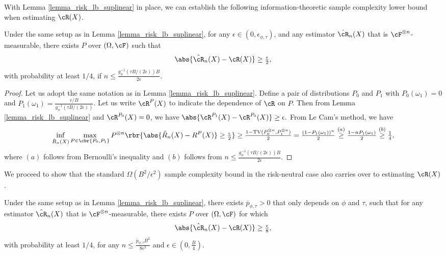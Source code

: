 \documentclass[9pt]{article} %
\numberwithin{equation}{section}
\renewcommand{\frac}[2]{\tfrac{#1}{#2}}
\begin{document}
With Lemma \ref{lemma_risk_lb_suplinear} in place, we can establish the following information-theoretic sample complexity lower bound when estimating $\cR(X)$. 




\begin{theorem}\label{thrm_sample_lb_growth_suplinear}
Under the same setup as in Lemma \ref{lemma_risk_lb_suplinear}, for any $\epsilon \in (0,  \epsilon_{\phi, \tau})$,  and any estimator $\hat{\cR}_n(X)$ that is $\cF^{\otimes n}$-measurable,
there exists $P$ over $(\Omega, \cF)$ such that 
\begin{align*}
\abs{\hat{\cR}_n (X) - \cR(X) } \geq \frac{\epsilon}{2},
\end{align*}
with probability at least $1/4$, 
if $n \leq \frac{ g_{\phi}^{-1} (\tau B / (2\epsilon)) B }{  2\epsilon }$.
\end{theorem}

\begin{proof}
Let us adopt the same notation as in Lemma \ref{lemma_risk_lb_suplinear}.
Define a pair of distributions $P_0$ and $P_1$ with
$P_0(\omega_1) = 0$ and $P_1(\omega_1) = \frac{\epsilon / B}{g_\phi^{-1}( \tau B / (2\epsilon))}$.
Let us write $\cR^P(X)$ to indicate the dependence of $\cR$ on $P$.
Then from Lemma \ref{lemma_risk_lb_suplinear} and $\cR^{P_0}(X) = 0$, we have 
$
\abs{\cR^{P_1}(X) - \cR^{P_0}(X)} \geq  \epsilon.
$
From Le Cam's method, we have 
\begin{align*}
\inf_{\hat{R}_n (X) } \max_{P \in \cbr{P_0, P_1} } P^{\otimes n} \rbr{
\abs{\hat{R}_n (X) - R^P(X)} \geq \frac{\epsilon}{2}  
}
\geq 
\frac{1 - \mathrm{TV}(P_0^{\otimes n}, P_1^{\otimes n}) }{2}
= \frac{(1- P_1(\omega_1))^n}{2}
\overset{(a)}{\geq} \frac{1 - n P_1(\omega_1)}{2}
\overset{(b)}{\geq} \frac{1}{4}
,
\end{align*}
where $(a)$ follows from Bernoulli's inequality and $(b)$ follows from 
 $n \leq \frac{ g_{\phi}^{-1} (\tau B / (2\epsilon)) B }{  2\epsilon }$.
\end{proof}


We proceed to show that the standard $\Omega(B^2/\epsilon^2)$ sample complexity bound in the risk-neutral case also carries over to estimating $\cR(X)$. 


\begin{theorem}\label{thrm_sample_quadratic_lb_suplinear}
Under the same setup as in Lemma \ref{lemma_risk_lb_suplinear}, there exists $\overline{p}_{\phi,\tau} > 0$ that only depends on $\phi$ and $\tau$, such that 
for any estimator $\hat{\cR}_n(X)$ that is $\cF^{\otimes n}$-measurable,
there exists $P$ over $(\Omega, \cF)$ for which 
 \begin{align*}
\abs{\hat{\cR}_n (X) - \cR(X) } \geq \frac{\epsilon}{8},
\end{align*}
with probability at least $1/4$, 
for any $n \leq \frac{{\overline{p}_{\phi,\tau} } B^2}{8 \epsilon^2}$ and $\epsilon \in (0, \frac{B}{4})$. 
\end{theorem}
\end{document}
